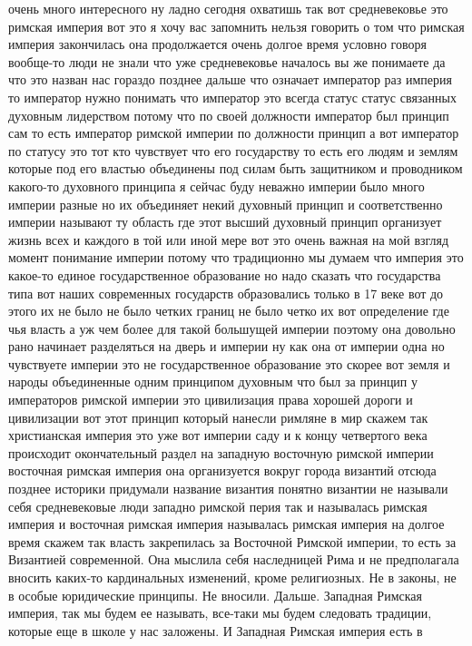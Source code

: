 очень много интересного ну ладно сегодня охватишь так вот средневековье это
римская империя вот это я хочу вас запомнить нельзя говорить о том что римская
империя закончилась она продолжается очень долгое время условно говоря вообще-то
люди не знали что уже средневековье началось вы же понимаете да что это назван
нас гораздо позднее дальше что означает император раз империя то император нужно
понимать что император это всегда статус статус связанных духовным лидерством
потому что по своей должности император был принцип сам то есть император
римской империи по должности принцип а вот император по статусу это тот кто
чувствует что его государству то есть его людям и землям которые под его властью
объединены под силам быть защитником и проводником какого-то духовного принципа
я сейчас буду неважно империи было много империи разные но их объединяет некий
духовный принцип и соответственно империи называют ту область где этот высший
духовный принцип организует жизнь всех и каждого в той или иной мере вот это
очень важная на мой взгляд момент понимание империи потому что традиционно мы
думаем что империя это какое-то единое государственное образование но надо
сказать что государства типа вот наших современных государств образовались
только в 17 веке вот до этого их не было не было четких границ не было четко их
вот определение где чья власть а уж чем более для такой большущей империи
поэтому она довольно рано начинает разделяться на дверь и империи ну как она от
империи одна но чувствуете империи это не государственное образование это скорее
вот земля и народы объединенные одним принципом духовным что был за принцип у
императоров римской империи это цивилизация права хорошей дороги и цивилизации
вот этот принцип который нанесли римляне в мир скажем так христианская империя
это уже вот империи саду и к концу четвертого века происходит окончательный
раздел на западную восточную римской империи восточная римская империя она
организуется вокруг города византий отсюда позднее историки придумали название
византия понятно византии не называли себя средневековые люди западно римской
перия так и называлась римская империя и восточная римская империя называлась
римская империя на долгое время скажем так власть закрепилась за Восточной
Римской империи, то есть за Византией современной. Она мыслила себя наследницей
Рима и не предполагала вносить каких-то кардинальных изменений, кроме
религиозных. Не в законы, не в особые юридические принципы. Не вносили. Дальше.
Западная Римская империя, так мы будем ее называть, все-таки мы будем следовать
традиции, которые еще в школе у нас заложены. И Западная Римская империя есть в
